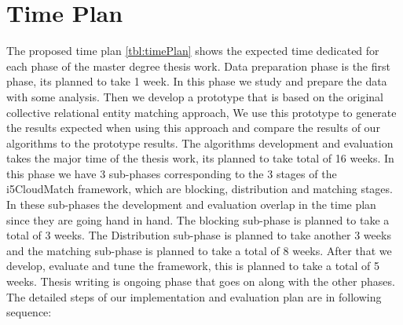 \chapter{Time Plan}
The proposed time plan \ref{tbl:timePlan} shows the expected time dedicated for each phase of the master degree thesis work. Data preparation phase is the first phase, its planned to take 1 week. In this phase we study and prepare the data with some analysis. Then we develop a prototype that is based on the original collective relational entity matching approach, We use this prototype to generate the results expected when using this approach and compare the results of our algorithms to the prototype results. The algorithms development and evaluation takes the major time of the thesis work, its planned to take total of 16 weeks. In this phase we have 3 sub-phases corresponding to the 3 stages of the i5CloudMatch framework, which are blocking, distribution and matching stages. In these sub-phases the development and evaluation overlap in the time plan since they are going hand in hand. The blocking sub-phase is planned to take a total of 3 weeks. The Distribution sub-phase is planned to take another 3 weeks and the matching sub-phase is planned to take a total of 8 weeks. After that we develop, evaluate and tune the framework, this is planned to take a total of 5 weeks. Thesis writing is ongoing phase that goes on along with the other phases.
The detailed steps of our implementation and evaluation plan are in following sequence:
